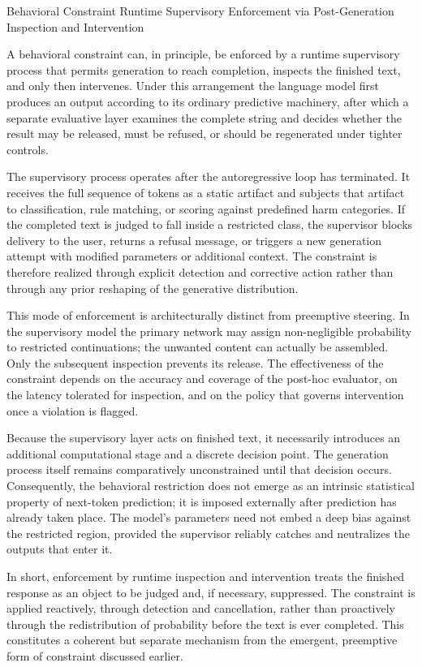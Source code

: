 Behavioral Constraint
Runtime Supervisory Enforcement via Post-Generation Inspection and Intervention

A behavioral constraint can, in principle, be enforced by a runtime supervisory process that permits generation to reach completion, inspects the finished text, and only then intervenes. Under this arrangement the language model first produces an output according to its ordinary predictive machinery, after which a separate evaluative layer examines the complete string and decides whether the result may be released, must be refused, or should be regenerated under tighter controls.

The supervisory process operates after the autoregressive loop has terminated. It receives the full sequence of tokens as a static artifact and subjects that artifact to classification, rule matching, or scoring against predefined harm categories. If the completed text is judged to fall inside a restricted class, the supervisor blocks delivery to the user, returns a refusal message, or triggers a new generation attempt with modified parameters or additional context. The constraint is therefore realized through explicit detection and corrective action rather than through any prior reshaping of the generative distribution.

This mode of enforcement is architecturally distinct from preemptive steering. In the supervisory model the primary network may assign non-negligible probability to restricted continuations; the unwanted content can actually be assembled. Only the subsequent inspection prevents its release. The effectiveness of the constraint depends on the accuracy and coverage of the post-hoc evaluator, on the latency tolerated for inspection, and on the policy that governs intervention once a violation is flagged.

Because the supervisory layer acts on finished text, it necessarily introduces an additional computational stage and a discrete decision point. The generation process itself remains comparatively unconstrained until that decision occurs. Consequently, the behavioral restriction does not emerge as an intrinsic statistical property of next-token prediction; it is imposed externally after prediction has already taken place. The model’s parameters need not embed a deep bias against the restricted region, provided the supervisor reliably catches and neutralizes the outputs that enter it.

In short, enforcement by runtime inspection and intervention treats the finished response as an object to be judged and, if necessary, suppressed. The constraint is applied reactively, through detection and cancellation, rather than proactively through the redistribution of probability before the text is ever completed. This constitutes a coherent but separate mechanism from the emergent, preemptive form of constraint discussed earlier.

